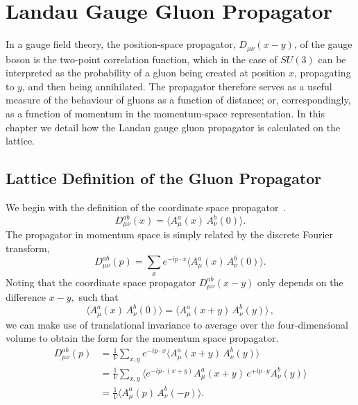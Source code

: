 
\chapter{Landau Gauge Gluon Propagator} \label{chapter:GluonPropagator}
\ifpdf
    \graphicspath{{Chapter4/Figs/Raster/}{Chapter4/Figs/PDF/}{Chapter4/Figs/}}
\else
    \graphicspath{{Chapter4/Figs/Vector/}{Chapter4/Figs/}}
\fi
In a gauge field theory, the position-space propagator, $D_{\mu\nu}(x-y)$, of the gauge boson is the two-point correlation function, which in the case of $SU(3)$ can be interpreted as the probability of a gluon being created at position $x$, propagating to $y$, and then being annihilated. The propagator therefore serves as a useful measure of the behaviour of gluons as a function of distance; or, correspondingly, as a function of momentum in the momentum-space representation. In this chapter we detail how the Landau gauge gluon propagator is calculated on the lattice.
\section{Lattice Definition of the Gluon Propagator}
We begin with the definition of the coordinate space propagator~\cite{Zwanziger:1991gz,Cucchieri:1999sz,Langfeld:2001cz}.
\begin{equation}
D^{ab}_{\mu\nu}(x) = \langle A^a_\mu(x) \, A^b_\nu(0)\rangle.
\label{eq:coordGluonProp}
\end{equation}
The propagator in momentum space is simply related by the discrete Fourier transform,
\begin{equation}
D^{ab}_{\mu\nu}(p) = \sum_x e^{-ip\cdot x} \langle A^a_\mu(x) \, A^b_\nu(0) \rangle. 
\end{equation}
Noting that the coordinate space propagator $D^{ab}_{\mu\nu}(x-y)$ only depends on the difference $x-y,$ such that
\begin{equation}
\langle A^a_\mu(x) \, A^b_\nu(0)\rangle = \langle A^a_\mu(x+y) \, A^b_\nu(y)\rangle\, ,
\end{equation}
we can make use of translational invariance to average over the four-dimensional volume to obtain the form for the momentum space propagator.
\begin{align}
D^{ab}_{\mu\nu}(p) &= \frac{1}{V}\sum_{x,y} e^{-ip\cdot x}\langle A^a_\mu(x+y) \, A^b_\nu(y) \rangle \nonumber \\
                &= \frac{1}{V}\sum_{x,y} \langle e^{-ip\cdot (x+y)} A^a_\mu(x+y) \, e^{+ip\cdot y}A^b_\nu(y) \rangle \nonumber \\
                &= \frac{1}{V}\langle A^a_\mu(p) \, A^b_\nu(-p) \rangle. \label{eq:gluPropxtop}
\end{align}

